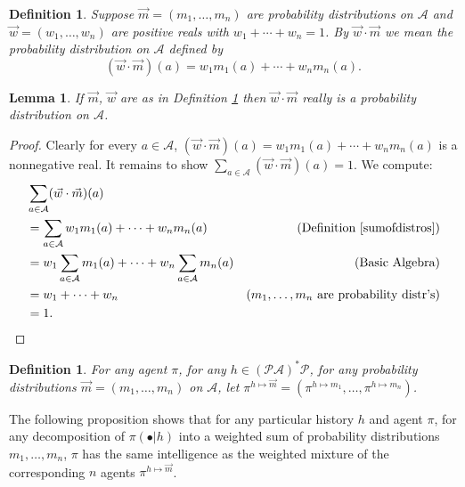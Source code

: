 \documentclass{article}
\newtheorem{definition}[theorem]{Definition}
\newtheorem{lemma}[theorem]{Lemma}
\begin{document}
\begin{definition}
\label{sumofdistros}
    Suppose $\vec m=(m_1,\ldots,m_n)$ are probability distributions on $\mathcal A$
    and $\vec w=(w_1,\ldots,w_n)$ are positive reals with
    $w_1+\cdots+w_n=1$. By $\vec w\cdot\vec m$ we mean the probability distribution
    on $\mathcal A$ defined by
    \[
        (\vec w\cdot\vec m)(a) = w_1m_1(a) + \cdots + w_nm_n(a).
    \]
\end{definition}

\begin{lemma}
    If $\vec m$, $\vec w$ are as in Definition \ref{sumofdistros}
    then $\vec w\cdot\vec m$ really is a probability distribution on $\mathcal A$.
\end{lemma}

\begin{proof}
    Clearly for every $a\in\mathcal A$,
    $(\vec w\cdot\vec m)(a) = w_1m_1(a) + \cdots + w_nm_n(a)$ is a nonnegative
    real. It remains to show $\sum_{a\in\mathcal A}(\vec w\cdot\vec m)(a)=1$.
    We compute:
    \begin{align*}
        &{} \sum_{a\in\mathcal A}(\vec w\cdot\vec m)(a)\\
        &=
        \sum_{a\in\mathcal A} w_1m_1(a) + \cdots + w_nm_n(a)
            &\mbox{(Definition \ref{sumofdistros})}\\
        &=
        w_1\sum_{a\in\mathcal A} m_1(a) + \cdots + w_n\sum_{a\in\mathcal A}m_n(a)
            &\mbox{(Basic Algebra)}\\
        &= w_1 + \cdots + w_n
            &\mbox{($m_1,\ldots,m_n$ are probability distr's)}\\
        &= 1.
    \end{align*}
\end{proof}

\begin{definition}
    For any agent $\pi$, for any $h\in(\mathcal P\mathcal A)^*\mathcal P$,
    for any probability distributions $\vec m=(m_1,\ldots,m_n)$ on $\mathcal A$,
    let $\pi^{h\mapsto \vec m}=(\pi^{h\mapsto m_1},\ldots,\pi^{h\mapsto m_n})$.
\end{definition}

The following proposition shows that
for any particular history $h$ and agent $\pi$,
for any decomposition of $\pi(\bullet|h)$ into a weighted sum
of probability distributions $m_1,\ldots,m_n$,
$\pi$ has the same intelligence as the weighted mixture of the corresponding $n$ agents
$\pi^{h\mapsto \vec m}$.
\end{document}
